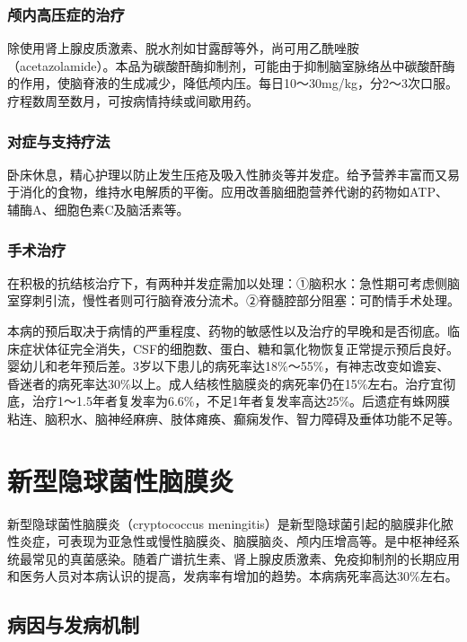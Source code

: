 \subsubsection{颅内高压症的治疗}

除使用肾上腺皮质激素、脱水剂如甘露醇等外，尚可用乙酰唑胺（acetazolamide）。本品为碳酸酐酶抑制剂，可能由于抑制脑室脉络丛中碳酸酐酶的作用，使脑脊液的生成减少，降低颅内压。每日10～30mg/kg，分2～3次口服。疗程数周至数月，可按病情持续或间歇用药。

\subsubsection{对症与支持疗法}

卧床休息，精心护理以防止发生压疮及吸入性肺炎等并发症。给予营养丰富而又易于消化的食物，维持水电解质的平衡。应用改善脑细胞营养代谢的药物如ATP、辅酶A、细胞色素C及脑活素等。

\subsubsection{手术治疗}

在积极的抗结核治疗下，有两种并发症需加以处理：①脑积水：急性期可考虑侧脑室穿刺引流，慢性者则可行脑脊液分流术。②脊髓腔部分阻塞：可酌情手术处理。

本病的预后取决于病情的严重程度、药物的敏感性以及治疗的早晚和是否彻底。临床症状体征完全消失，CSF的细胞数、蛋白、糖和氯化物恢复正常提示预后良好。婴幼儿和老年预后差。3岁以下患儿的病死率达18\%～55\%，有神志改变如谵妄、昏迷者的病死率达30\%以上。成人结核性脑膜炎的病死率仍在15\%左右。治疗宜彻底，治疗1～1.5年者复发率为6.6\%，不足1年者复发率高达25\%。后遗症有蛛网膜粘连、脑积水、脑神经麻痹、肢体瘫痪、癫痫发作、智力障碍及垂体功能不足等。

\protect\hypertarget{text00249.html}{}{}

\section{新型隐球菌性脑膜炎}

新型隐球菌性脑膜炎（cryptococcus
meningitis）是新型隐球菌引起的脑膜非化脓性炎症，可表现为亚急性或慢性脑膜炎、脑膜脑炎、颅内压增高等。是中枢神经系统最常见的真菌感染。随着广谱抗生素、肾上腺皮质激素、免疫抑制剂的长期应用和医务人员对本病认识的提高，发病率有增加的趋势。本病病死率高达30\%左右。

\subsection{病因与发病机制}

